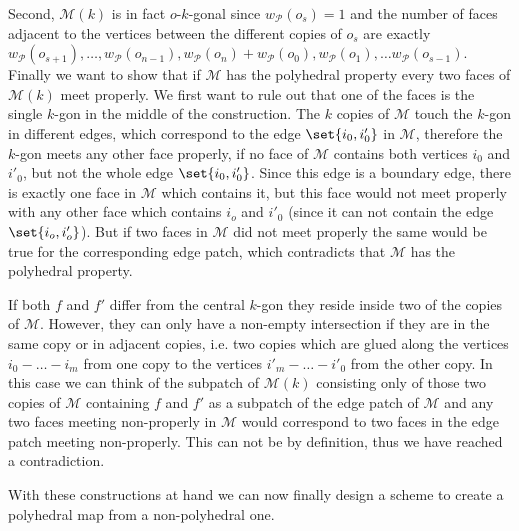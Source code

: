 \begin{construction}
\begin{cdescription}
    Second, $\mathcal{M}(k)$ is in fact $o$-$k$-gonal since $w_{\mathcal{P}}(o_s) = 1$ and the number of faces adjacent to the vertices between the different copies of $o_s$ are exactly $w_{\mathcal{P}}(o_{s + 1}), \dots, w_{\mathcal{P}}(o_{n - 1}), w_{\mathcal{P}}(o_n) + w_{\mathcal{P}}(o_0), w_{\mathcal{P}}(o_1), \dots w_{\mathcal{P}}(o_{s - 1})$. Finally we want to show that if $\mathcal{M}$ has the polyhedral property every two faces of $\mathcal{M}(k)$ meet properly. We first want to rule out that one of the faces is the single $k$-gon in the middle of the construction. The $k$ copies of $\mathcal{M}$ touch the $k$-gon in different edges, which correspond to the edge $\set{i_0, i'_0}$ in $\mathcal{M}$, therefore the $k$-gon meets any other face properly, if no face of $\mathcal{M}$ contains both vertices $i_0$ and $i'_0$, but not the whole edge $\set{i_0, i'_0}$. Since this edge is a boundary edge, there is exactly one face in $\mathcal{M}$ which contains it, but this face would not meet properly with any other face which contains $i_o$ and $i'_0$ (since it can not contain the edge $\set{i_o, i'_o}$). But if two faces in $\mathcal{M}$ did not meet properly the same would be true for the corresponding edge patch, which contradicts that $\mathcal{M}$ has the polyhedral property. 

    If both $f$ and $f'$ differ from the central $k$-gon they reside inside two of the copies of $\mathcal{M}$. However, they can only have a non-empty intersection if they are in the same copy or in adjacent copies, i.e. two copies which are glued along the vertices $i_0 - \dots - i_m$ from one copy to the vertices $i'_m - \dots - i'_0$ from the other copy. In this case we can think of the subpatch of $\mathcal{M}(k)$ consisting only of those two copies of $\mathcal{M}$ containing $f$ and $f'$ as a subpatch of the edge patch of $\mathcal{M}$ and any two faces meeting non-properly in $\mathcal{M}$ would correspond to two faces in the edge patch meeting non-properly. This can not be by definition, thus we have reached a contradiction.
  \end{cdescription}
\end{construction}

With these constructions at hand we can now finally design a scheme to create a polyhedral map from a non-polyhedral one.

